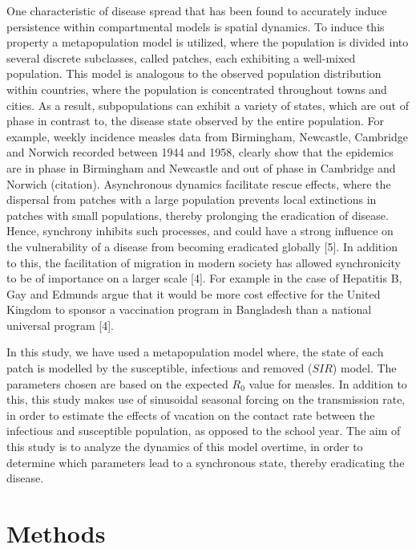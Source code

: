 \documentclass[twocolumn,nofootinbib,showkeys,twoside,floatfix,unsortedaddress,flushbottom,10pt,aps,pra]{report}
\begin{document}
One characteristic of disease spread that has been found to accurately induce persistence within compartmental models is spatial dynamics. To induce this property a metapopulation model is utilized, where the population is divided into several discrete subclasses, called patches, each exhibiting a well-mixed population. This model is analogous to the observed population distribution within countries, where the population is concentrated throughout towns and cities. As a result, subpopulations can exhibit a variety of states, which are out of phase in contrast to, the disease state observed by the entire population. For example, weekly incidence measles data from Birmingham, Newcastle, Cambridge and Norwich recorded between 1944 and 1958, clearly show that the epidemics are in phase in Birmingham and Newcastle and out of phase in Cambridge and Norwich (citation).  Asynchronous dynamics facilitate rescue effects, where the dispersal from patches with a large population prevents local extinctions in patches with small populations, thereby prolonging the eradication of disease. Hence, synchrony inhibits such processes, and could have a strong inﬂuence on the vulnerability of a disease from becoming eradicated globally [5]. In addition to this, the facilitation of migration in modern society has allowed synchronicity to be of importance on a larger scale [4]. For example in the case of Hepatitis B, Gay and Edmunds argue that it would be more cost effective for the United Kingdom to sponsor a vaccination program in Bangladesh than a national universal program [4]. 

In this study, we have used a metapopulation model where, the state of each patch is modelled by the susceptible, infectious and removed ($SIR$) model. The parameters chosen are based on the expected $R_0$ value for measles.  In addition to this, this study makes use of sinusoidal seasonal forcing on the transmission rate, in order to estimate the effects of vacation  on the contact rate between the infectious and susceptible population, as opposed to the school year. The aim of this study is to analyze the dynamics of this model overtime, in order to determine which parameters lead to a synchronous state, thereby eradicating the disease. \par

\section{Methods}
\end{document}
